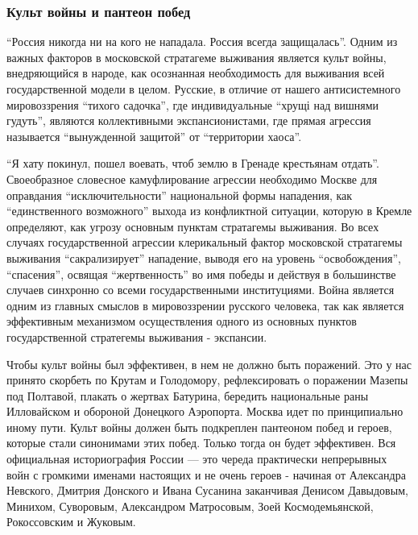  
 
 
 
 

\subsubsection{Культ войны и пантеон побед}

\enquote{Россия никогда ни на кого не нападала. Россия всегда защищалась}.
Одним из важных факторов в московской стратагеме выживания является культ
войны, внедряющийся в народе, как осознанная необходимость для выживания всей
государственной модели в целом. Русские, в отличие от нашего антисистемного
мировоззрения \enquote{тихого садочка}, где индивидуальные \enquote{хрущі над
вишнями гудуть}, являются коллективными экспансионистами, где прямая агрессия
называется \enquote{вынужденной защитой} от \enquote{территории хаоса}.

\enquote{Я хату покинул, пошел воевать, чтоб землю в Гренаде крестьянам
отдать}.  Своеобразное словесное камуфлирование агрессии необходимо Москве для
оправдания \enquote{исключительности} национальной формы нападения, как
\enquote{единственного возможного} выхода из конфликтной ситуации, которую в
Кремле определяют, как угрозу основным пунктам стратагемы выживания. Во всех
случаях государственной агрессии клерикальный фактор московской стратагемы
выживания \enquote{сакрализирует} нападение, выводя его на уровень
\enquote{освобождения}, \enquote{спасения}, освящая \enquote{жертвенность} во
имя победы и действуя в большинстве случаев синхронно со всеми государственными
институциями. Война является одним из главных смыслов в мировоззрении русского
человека, так как является эффективным механизмом осуществления одного из
основных пунктов государственной стратегемы выживания - экспансии.

Чтобы культ войны был эффективен, в нем не должно быть поражений. Это у нас
принято скорбеть по Крутам и Голодомору, рефлексировать о поражении Мазепы под
Полтавой, плакать о жертвах Батурина, бередить национальные раны Илловайском и
обороной Донецкого Аэропорта. Москва идет по принципиально иному пути. Культ
войны должен быть подкреплен пантеоном побед и героев, которые стали синонимами
этих побед. Только тогда он будет эффективен. Вся официальная историография
России — это череда практически непрерывных войн с громкими именами настоящих и
не очень героев - начиная от Александра Невского, Дмитрия Донского и Ивана
Сусанина заканчивая Денисом Давыдовым, Минихом, Суворовым, Александром
Матросовым, Зоей Космодемьянской, Рокоссовским и Жуковым.

